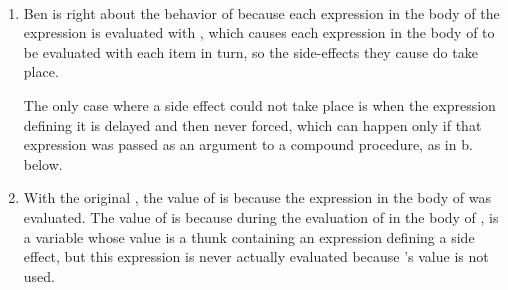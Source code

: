\begin{exe}[4.30]
    \ \vspace{-20pt}
    \begin{enumerate}
        \item Ben is right about the behavior of  because each 
            expression in the body of the  expression is evaluated 
            with , which causes each expression in the body of 
             to be evaluated with each item in turn, so the 
            side-effects they cause do take place.

	    The only case where a side effect could not take place is when the 
	    expression defining it is delayed and then never forced, which can 
	    happen only if that expression was passed as an argument to 
	    a compound procedure, as in b. below.
        \item With the original , the value of
	     is  because the  expression in 
	    the body of  was evaluated. The value of  is 
	     because during the evaluation of  in the body of 
	    ,  is a variable whose value is a thunk containing 
	    an expression defining a side effect, but this expression is never 
	    actually evaluated because ’s value is not used.


\end{enumerate}
\end{exe}
